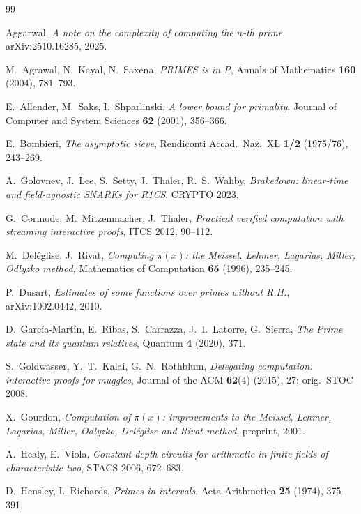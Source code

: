 \documentclass[11pt]{article}
\theoremstyle{plain}
\theoremstyle{definition}
\theoremstyle{remark}
\begin{document}
\begin{thebibliography}{99}
\small

 Aggarwal, \emph{A note on the complexity of computing the $n$-th prime}, arXiv:2510.16285, 2025.

 M.~Agrawal, N.~Kayal, N.~Saxena, \emph{PRIMES is in P}, Annals of Mathematics \textbf{160} (2004), 781--793.

 E.~Allender, M.~Saks, I.~Shparlinski, \emph{A lower bound for primality}, Journal of Computer and System Sciences \textbf{62} (2001), 356--366.

 E.~Bombieri, \emph{The asymptotic sieve}, Rendiconti Accad.\ Naz.\ XL \textbf{1/2} (1975/76), 243--269.

 A.~Golovnev, J.~Lee, S.~Setty, J.~Thaler, R.~S.~Wahby, \emph{Brakedown: linear-time and field-agnostic SNARKs for R1CS}, CRYPTO 2023.

 G.~Cormode, M.~Mitzenmacher, J.~Thaler, \emph{Practical verified computation with streaming interactive proofs}, ITCS 2012, 90--112.

 M.~Del\'egl\`ise, J.~Rivat, \emph{Computing $\pi(x)$: the Meissel, Lehmer, Lagarias, Miller, Odlyzko method}, Mathematics of Computation \textbf{65} (1996), 235--245.

 P.~Dusart, \emph{Estimates of some functions over primes without R.H.}, arXiv:1002.0442, 2010.

 D.~Garc\'ia-Mart\'in, E.~Ribas, S.~Carrazza, J.~I.~Latorre, G.~Sierra, \emph{The Prime state and its quantum relatives}, Quantum \textbf{4} (2020), 371.

 S.~Goldwasser, Y.~T.~Kalai, G.~N.~Rothblum, \emph{Delegating computation: interactive proofs for muggles}, Journal of the ACM \textbf{62}(4) (2015), 27; orig.\ STOC 2008.

 X.~Gourdon, \emph{Computation of $\pi(x)$: improvements to the Meissel, Lehmer, Lagarias, Miller, Odlyzko, Del\'egl\`ise and Rivat method}, preprint, 2001.

 A.~Healy, E.~Viola, \emph{Constant-depth circuits for arithmetic in finite fields of characteristic two}, STACS 2006, 672--683.

 D.~Hensley, I.~Richards, \emph{Primes in intervals}, Acta Arithmetica \textbf{25} (1974), 375--391.


\end{thebibliography}
\end{document}
